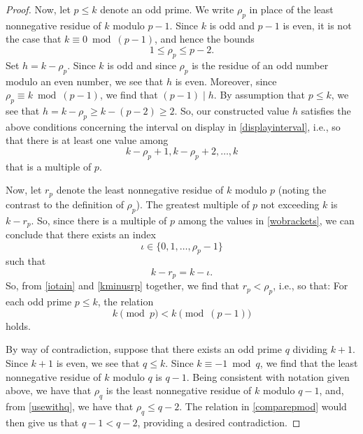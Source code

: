 \documentclass[12pt]{article}
\begin{document}
\begin{proof}
 Now, let $p \leq k$ denote an odd prime. We write $\rho_p$ in place of the least nonnegative residue of $k$ modulo $p-1$. Since $k$ is 
 odd and $p-1$ is even, 
 it is not the case that $k \equiv 0 \bmod {(p-1)}$, and hence the bounds
\begin{equation}\label{usewithq} 
 1 \leq \rho_p \leq p - 2. 
\end{equation}
 Set $h = k - \rho_p$. Since $k$ is odd and since $\rho_p$ is the residue of an odd number modulo an even number, 
 we see that $h$ is even.
 Moreover, since $\rho_p \equiv k \bmod {(p-1)}$, 
 we find that $(p-1) \mid h$. By assumption
 that $p \leq k$, we see that 
 $h = k - \rho_p \geq k - (p-2) \geq 2$. 
 So, our constructed value $h$ 
 satisfies the above conditions concerning the interval on display in \eqref{displayinterval}, i.e., 
 so that there is at least one value among
\begin{equation}\label{wobrackets}
 k - \rho_p + 1, k - \rho_p+2, \ldots, k 
\end{equation}
 that is a multiple of $p$. 

 Now, let $r_p$ denote the least nonnegative residue of $k$ modulo $p$ (noting the contrast to the definition of $\rho_p$). The greatest 
 multiple of $p$ not exceeding $k$ is $k - r_p$. So, since 
 there is a multiple of $p$ among the 
 values in \eqref{wobrackets}, 
 we can conclude that there exists an index 
\begin{equation}\label{iotain} 
 \iota \in 
 \{ 0, 1, \ldots, \rho_p - 1 \} 
\end{equation} 
 such that 
\begin{equation}\label{kminusrp}
 k - r_{p} = k - \iota. 
\end{equation}
 So, from \eqref{iotain} and \eqref{kminusrp} together, we find that 
 $ r_p < \rho_p$, i.e., so that: For each odd prime $p \leq k$, the relation 
\begin{equation}\label{comparepmod}
 k \pmod {p} < k \pmod {(p-1)} 
\end{equation}
 holds. 

 By way of contradiction, suppose that there exists an odd prime $q$ dividing $k + 1$. Since $k+1$ is even, we see that $q \leq k$. Since 
 $k \equiv -1 \bmod q$, we find that the least nonnegative 
 residue of $k$ modulo $q$ is $q-1$. 
 Being consistent with notation given above, 
 we have that $\rho_q$ 
 is the least nonnegative residue of $k$ modulo $q - 1$, 
 and, from \eqref{usewithq}, we have that 
 $\rho_{q} \leq q-2$. 
 The relation in \eqref{comparepmod} would then give us that 
 $q - 1 < q - 2$, 
 providing a desired contradiction. 


\end{proof}
\end{document}

